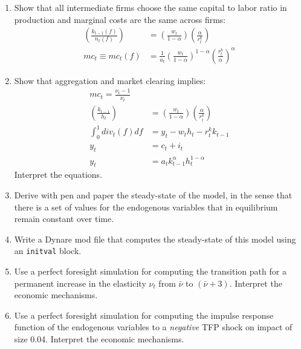 \documentclass{article}
\begin{document}
\begin{enumerate}
\item Show that all intermediate firms choose the same capital to labor ratio in production and marginal costs are the same across firms:
\begin{align}
\left(\frac{k_{t-1}(f)}{n_t(f)}\right) &= \left(\frac{w_t}{1-\alpha}\right) \left(\frac{\alpha}{r^k_t}\right) \label{eq:RBCMonopIrrInv.IntermediateFirms.CapitalLaborRatio}
\\
mc_t \equiv mc_t(f) &= \frac{1}{a_t} \left(\frac{w_t}{1-\alpha}\right)^{1-\alpha} \left(\frac{r^k_t}{\alpha}\right)^{\alpha} \label{eq:RBCMonopIrrInv.RealMarginalCosts}
\end{align}


\item Show that aggregation and market clearing implies:
\begin{align}
mc_t = \frac{\nu_t-1}{\nu_t} \label{eq:RBCMonopIrrInv.MarginalCostsAggregated}
\\
\left(\frac{k_{t-1}}{h_t}\right) &= \left(\frac{w_t}{1-\alpha}\right) \left(\frac{\alpha}{r^k_t}\right) \label{eq:RBCMonopIrrInv.IntermediateFirms.CapitalLaborRatioAggregated}
\\
\int_{0}^{1} div_t(f) df &= y_t - w_t h_t - r^k_t k_{t-1}\label{eq:RBCMonopIrrInv.IntermediateFirms.AggregateProfits}
\\
y_t &= c_t + i_t \label{eq:RBCMonopIrrInv.AggregateDemand}
\\
y_t &= a_t k_{t-1}^\alpha h_t^{1-\alpha} \label{eq:RBCMonopIrrInv.AggregateSupply}
\end{align}
Interpret the equations.

\item Derive with pen and paper the steady-state of the model, in the sense that there is a set of values for the endogenous variables that in equilibrium remain constant over time.

\item Write a Dynare mod file that computes the steady-state of this model using an \texttt{initval} block.

\item Use a perfect foresight simulation for computing the transition path for a permanent increase in the elasticity $\nu_t$ from $\bar{\nu}$ to $(\bar{\nu}+3)$.
Interpret the economic mechanisms.

\item Use a perfect foresight simulation for computing the impulse response function of the endogenous variables to a \emph{negative} TFP shock on impact of size 0.04.
Interpret the economic mechanisms.

\end{enumerate}
\end{document}
